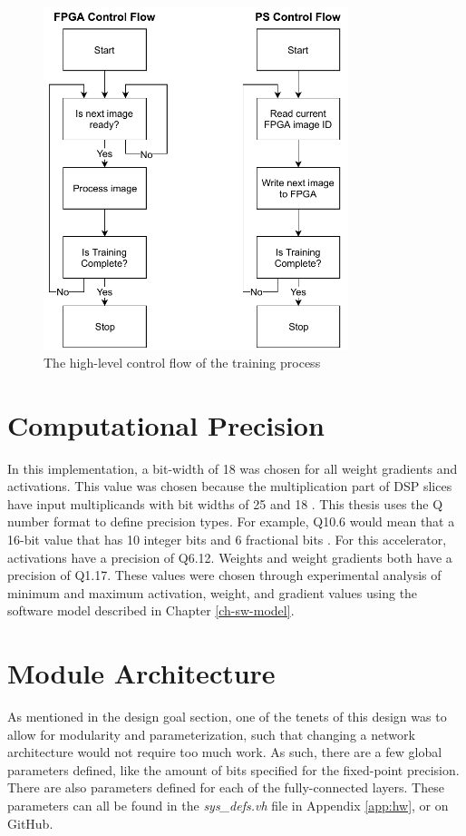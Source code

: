 \begin{figure}
	\centering 
	\includegraphics[width=3.5in]{figures/training_process_ps_pl}
	\caption{The high-level control flow of the training process}
	\label{ps-pl-training-process}
\end{figure}

\section{Computational Precision}
In this implementation, a bit-width of 18 was chosen for all weight gradients and activations. This value was chosen because the multiplication part of DSP slices have input multiplicands with bit widths of 25 and 18 \cite{dsp48}. This thesis uses the Q number format to define precision types. For example, Q10.6 would mean that a 16-bit value that has 10 integer bits and 6 fractional bits \cite{q-format}. For this accelerator, activations have a precision of Q6.12. Weights and weight gradients both have a precision of Q1.17. These values were chosen through experimental analysis of minimum and maximum activation, weight, and gradient values using the software model described in Chapter \ref{ch-sw-model}.

\section{Module Architecture}
As mentioned in the design goal section, one of the tenets of this design was to allow for modularity and parameterization, such that changing a network architecture would not require too much work. As such, there are a few global parameters defined, like the amount of bits specified for the fixed-point precision. There are also parameters defined for each of the fully-connected layers. These parameters can all be found in the \textit{sys\_defs.vh} file in  Appendix \ref{app:hw}, or on GitHub. 

